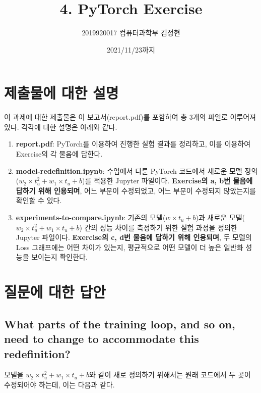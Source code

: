 \documentclass[letterpaper,10pt]{article}
\begin{document}
	
	\title{4. PyTorch Exercise}
	\author{2019920017 컴퓨터과학부 김정현}
	\date{2021/11/23까지}
	\maketitle
	
	\section{제출물에 대한 설명}
	
	이 과제에 대한 제출물은 이 보고서(report.pdf)를 포함하여 총 3개의 파일로 이루어져 있다. 각각에 대한 설명은 아래와 같다.
	
	\begin{enumerate}
		\item \textbf{report.pdf}: PyTorch를 이용하여 진행한 실험 결과를 정리하고, 이를 이용하여 Exercise의 각 물음에 답한다.
		
		\item \textbf{model-redefinition.ipynb}: 수업에서 다룬 PyTorch 코드에서 새로운 모델 정의($w_2 \times t_u^2 + w_1 \times t_u + b$)를 적용한 Jupyter 파일이다. \textbf{Exercise의 a, b번 물음에 답하기 위해 인용되며}, 어느 부분이 수정되었고, 어느 부분이 수정되지 않았는지를 확인할 수 있다.
		
		\item \textbf{experiments-to-compare.ipynb}: 기존의 모델($w \times t_u + b$)과 새로운 모델($w_2 \times t_u^2 + w_1 \times t_u + b$) 간의 성능 차이를 측정하기 위한 실험 과정을 정의한 Jupyter 파일이다. \textbf{Exercise의 c, d번 물음에 답하기 위해 인용되며}, 두 모델의 Loss 그래프에는 어떤 차이가 있는지, 평균적으로 어떤 모델이 더 높은 일반화 성능을 보이는지 확인한다.
	\end{enumerate}
	
	
	\section{질문에 대한 답안}
	
	\subsection{What parts of the training loop, and so on, need to change to accommodate this redefinition?}
	
	모델을 $w_2 \times t_u^2 + w_1 \times t_u + b$와 같이 새로 정의하기 위해서는 원래 코드에서 두 곳이 수정되어야 하는데, 이는 다음과 같다.
	
\end{document}
